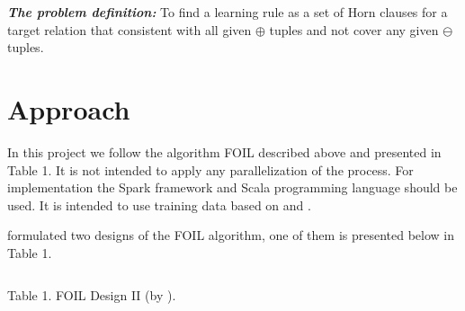 \documentclass{scrartcl}
\begin{document}
\textbf{\emph{The problem definition:}} To find a learning rule
as a set of Horn clauses  for a target relation
 that consistent with all given $\oplus$ tuples and not cover any given $\ominus$ tuples.


\section{Approach}

In this project we follow the algorithm FOIL described above and presented in Table 1.
It is not intended to apply any parallelization of the process. For implementation the Spark framework and Scala programming language should be used. It is intended to use training data based on \citep{Horvath2016} and \citep{Quinlan1990}.

\citet{Pazzani1992} formulated two designs of the FOIL algorithm,
one of them is presented below in Table 1.

\begin{tabular}{c}

\end{tabular}

Table 1. FOIL Design II (by \citet{Pazzani1992}).
\end{document}
